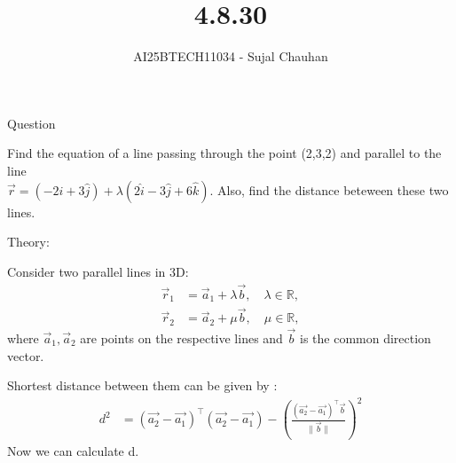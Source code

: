 \documentclass{beamer}
\title
{4.8.30}
\author 
{AI25BTECH11034 - Sujal Chauhan }
\begin{document}
\frame{\titlepage}
\begin{frame}{Question}

Find the equation of a line passing through the point (2,3,2) and parallel to the line \\
$\Vec{r}= (-2\hat{i}+3\hat{j})+\lambda(2\hat{i}-3\hat{j}+6\hat{k})$. Also, find the distance beteween these two lines.\\[2cm]
\end{frame}
\begin{frame}{Theory:}


Consider two parallel lines in 3D:
\begin{align}
    \vec{r}_1 &= \vec{a}_1 + \lambda \vec{b}, \quad \lambda \in \mathbb{R}, \\[6pt]
    \vec{r}_2 &= \vec{a}_2 + \mu \vec{b}, \quad \mu \in \mathbb{R},
\end{align}
where $\vec{a}_1, \vec{a}_2$ are points on the respective lines and $\vec{b}$ is the common direction vector.  


Shortest distance between them can be given by :
\begin{align}
    d^2 
    &= (\vec{a_2} - \vec{a_1})^\top (\vec{a_2} - \vec{a_1})
    - \left( \frac{ (\vec{a_2} - \vec{a_1})^\top \vec{b} }{ \lVert \vec{b} \rVert } \right)^2
\end{align}
Now we can calculate d.
\end{frame}
\end{document}
